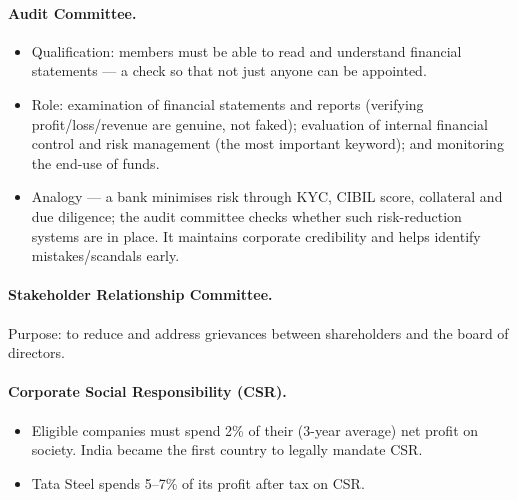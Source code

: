 \paragraph{Audit Committee.}
\begin{GovtPolicy}
\begin{itemize}
\item Qualification: members must be able to read and understand financial statements --- a check so that not just anyone can be appointed.
\item Role: examination of financial statements and reports (verifying profit/loss/revenue are genuine, not faked); evaluation of internal financial control and risk management (the most important keyword); and monitoring the end-use of funds.
\item Analogy --- a bank minimises risk through KYC, CIBIL score, collateral and due diligence; the audit committee checks whether such risk-reduction systems are in place. It maintains corporate credibility and helps identify mistakes/scandals early.
\end{itemize}
\end{GovtPolicy}

\paragraph{Stakeholder Relationship Committee.}
\begin{GovtPolicy}
Purpose: to reduce and address grievances between shareholders and the board of directors.
\end{GovtPolicy}

\paragraph{Corporate Social Responsibility (CSR).}
\begin{DataFact}
\begin{itemize}
\item Eligible companies must spend 2\% of their (3-year average) net profit on society. India became the first country to legally mandate CSR.
\item Tata Steel spends 5--7\% of its profit after tax on CSR.
\end{itemize}
\end{DataFact}

